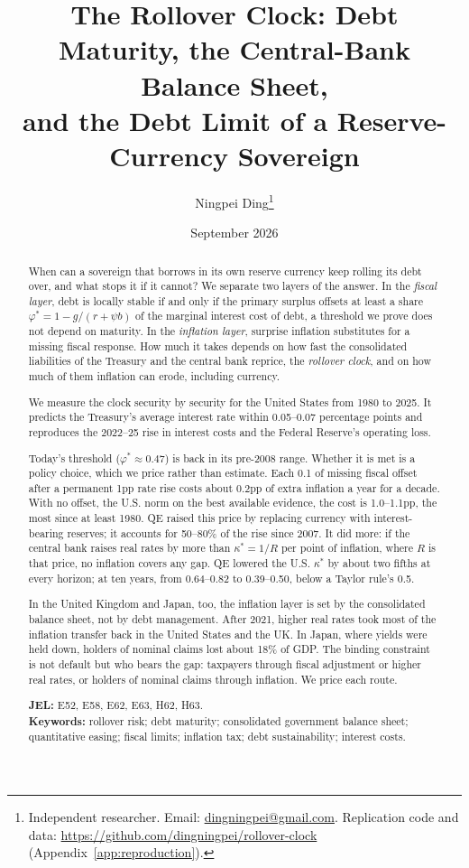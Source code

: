 \documentclass[11pt]{article}
\title{The Rollover Clock: Debt Maturity, the Central-Bank Balance Sheet,\\ and the Debt Limit of a Reserve-Currency Sovereign}
\author{Ningpei Ding\thanks{Independent researcher. Email: \href{mailto:dingningpei@gmail.com}{dingningpei@gmail.com}. Replication code and data: \url{https://github.com/dingningpei/rollover-clock} (Appendix~\ref{app:reproduction}).}}
\date{September 2026}
\begin{document}
\maketitle
\thispagestyle{empty}

\begin{abstract}
\noindent When can a sovereign that borrows in its own reserve currency keep rolling its debt over, and what stops it if it cannot? We separate two layers of the answer. In the \emph{fiscal layer}, debt is locally stable if and only if the primary surplus offsets at least a share $\varphi^*=1-g/(r+\psi b)$ of the marginal interest cost of debt, a threshold we prove does not depend on maturity. In the \emph{inflation layer}, surprise inflation substitutes for a missing fiscal response. How much it takes depends on how fast the consolidated liabilities of the Treasury and the central bank reprice, the \emph{rollover clock}, and on how much of them inflation can erode, including currency.

We measure the clock security by security for the United States from 1980 to 2025. It predicts the Treasury's average interest rate within 0.05--0.07 percentage points and reproduces the 2022--25 rise in interest costs and the Federal Reserve's operating loss.

Today's threshold ($\varphi^*\approx0.47$) is back in its pre-2008 range. Whether it is met is a policy choice, which we price rather than estimate. Each 0.1 of missing fiscal offset after a permanent 1pp rate rise costs about 0.2pp of extra inflation a year for a decade. With no offset, the U.S. norm on the best available evidence, the cost is 1.0--1.1pp, the most since at least 1980. QE raised this price by replacing currency with interest-bearing reserves; it accounts for 50--80\% of the rise since 2007. It did more: if the central bank raises real rates by more than $\kappa^*=1/R$ per point of inflation, where $R$ is that price, no inflation covers any gap. QE lowered the U.S. $\kappa^*$ by about two fifths at every horizon; at ten years, from 0.64--0.82 to 0.39--0.50, below a Taylor rule's 0.5.

In the United Kingdom and Japan, too, the inflation layer is set by the consolidated balance sheet, not by debt management. After 2021, higher real rates took most of the inflation transfer back in the United States and the UK. In Japan, where yields were held down, holders of nominal claims lost about 18\% of GDP. The binding constraint is not default but who bears the gap: taxpayers through fiscal adjustment or higher real rates, or holders of nominal claims through inflation. We price each route.

\medskip
\noindent\textbf{JEL:} E52, E58, E62, E63, H62, H63.\\
\noindent\textbf{Keywords:} rollover risk; debt maturity; consolidated government balance sheet; quantitative easing; fiscal limits; inflation tax; debt sustainability; interest costs.
\end{abstract}
\end{document}
